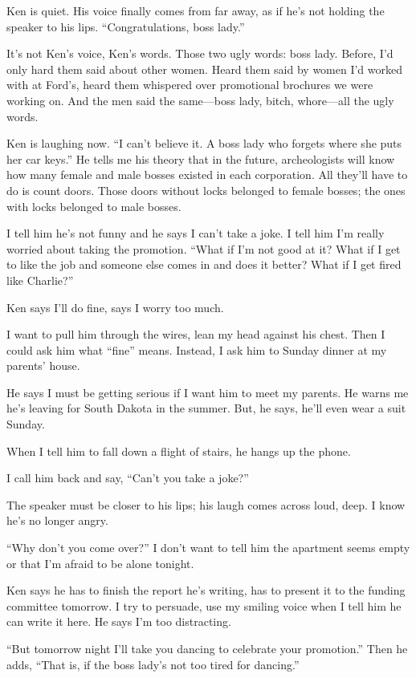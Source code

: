 \documentclass[
]{article}
\begin{document}
Ken is quiet. His voice finally comes from far away, as if he's not
holding the speaker to his lips. ``Congratulations, boss lady.''

It's not Ken's voice, Ken's words. Those two ugly words: boss lady.
Before, I'd only hard them said about other women. Heard them said by
women I'd worked with at Ford's, heard them whis­pered over promotional
brochures we were working on. And the men said the same---boss lady,
bitch, whore---all the ugly words.

Ken is laughing now. ``I can't believe it. A boss lady who forgets where
she puts her car keys.'' He tells me his theory that in the future,
archeologists will know how many female and male bosses existed in each
corporation. All they'll have to do is count doors. Those doors without
locks belonged to female bosses; the ones with locks belonged to male
bosses.

I tell him he's not funny and he says I can't take a joke. I tell him
I'm really worried about tak­ing the promotion. ``What if I'm not good
at it? What if I get to like the job and someone else comes in and does
it better? What if I get fired like Charlie?''

Ken says I'll do fine, says I worry too much.

I want to pull him through the wires, lean my head against his chest.
Then I could ask him what ``fine'' means. Instead, I ask him to Sunday
dinner at my parents' house.

He says I must be getting serious if I want him to meet my parents. He
warns me he's leaving for South Dakota in the summer. But, he says,
he'll even wear a suit Sunday.

When I tell him to fall down a flight of stairs, he hangs up the phone.

I call him back and say, ``Can't you take a joke?''

The speaker must be closer to his lips; his laugh comes across loud,
deep. I know he's no longer angry.

``Why don't you come over?'' I don't want to tell him the apartment
seems empty or that I'm afraid to be alone tonight.

Ken says he has to finish the report he's writing, has to present it to
the funding committee tomorrow. I try to persuade, use my smiling voice
when I tell him he can write it here. He says I'm too distracting.

``But tomorrow night I'll take you dancing to celebrate your
promotion.'' Then he adds, ``That is, if the boss lady's not too tired
for dancing.''
\end{document}
